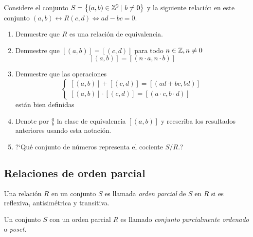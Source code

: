 \begin{problema}
Considere el conjunto $S=\left\{ (a,b)\in \mathbb{Z}^{2}\mid b\neq0 \right\}$ y la siguiente relación en este conjunto
$
(a,b)\rel{R}(c,d) \iff ad-bc=0.
$
\end{problema}
\begin{enumerate}
\item Demuestre que $R$ es una relación de equivalencia.
\item Demuestre que $[(a,b)]=[(c,d)]$ para todo $n\in\mathbb{Z}, n \neq 0$
$$
[(a,b)]=[(n\cdot a, n\cdot b)]
$$
\item Demuestre que las operaciones
$$
\begin{cases}
[(a,b)]+[(c,d)]=[(ad+bc,bd)] \\
[(a,b)]\cdot[(c,d)]=[(a\cdot c, b \cdot d)]
\end{cases}
$$ están bien definidas
\item Denote por $\frac{a}{b}$ la clase de equivalencia $[(a,b)]$ y reescriba los resultados anteriores usando esta notación.
\item ?`Qu\'e conjunto de números representa el cociente $S/R.$?
\end{enumerate}



\subsection{Relaciones de orden parcial}


	Una relación $R$ en un conjunto $S$ es llamada \emph{orden parcial} de $S$ en $R$ si es reflexiva, antisim\'etrica y transitiva. 
	
	Un conjunto $S$ con un orden parcial $R$ es llamado \emph{conjunto parcialmente ordenado} o \emph{poset.}



